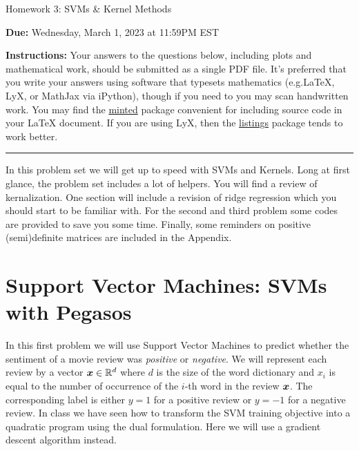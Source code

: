 \documentclass{article}
\newcommand{\wipcom}[1]{\textcolor{red}{WIP: #1}}
\newcommand{\ruleskip}{\bigskip\hrule\bigskip}
\theoremstyle{plain}
\theoremstyle{definition}
\begin{document}

\pagestyle{myheadings} 

\begin{center}
{\Large
Homework 3: SVMs \& Kernel Methods
} 
\end{center}

{
{ \color{nyupurple} \textbf{Due:} Wednesday, March 1, 2023 at 11:59PM EST} 
} 

\textbf{Instructions: }Your answers to the questions below, including plots and mathematical
 work, should be submitted as a single PDF file.  It's preferred that you write your answers using software that typesets mathematics (e.g.LaTeX, LyX, or MathJax via iPython), though if you need to you may scan handwritten work.  You may find the \href{https://github.com/gpoore/minted}{minted} package convenient for including source code in your LaTeX document.  If you are using LyX, then the \href{https://en.wikibooks.org/wiki/LaTeX/Source_Code_Listings}{listings} package tends to work better. \\
\ruleskip

In this problem set we will get up to speed with SVMs and Kernels. Long at first glance, the problem set includes a lot of helpers. You will find a review of kernalization. One section will include a revision of ridge regression which you should start to be familiar with. For the second and third problem some codes are provided to save you some time. Finally, some reminders on positive (semi)definite matrices are included in the Appendix.

\section{\large Support Vector Machines: SVMs with Pegasos}

In this first problem we will use Support Vector Machines to predict whether the sentiment of a movie review was \emph{positive} or \emph{negative}. We will represent each review by a vector $\boldsymbol{x} \in {\mathbb{R}}^d$ where $d$ is the size of the word dictionary and $x_i$ is equal to the number of occurrence of the $i$-th word in the review $\boldsymbol{x}$. The corresponding label is either $y=1$ for a positive review or $y=-1$ for a negative review.
In class we have seen how to transform the SVM training objective into a quadratic program using the dual formulation. Here we will use a gradient descent algorithm instead.
\end{document}
